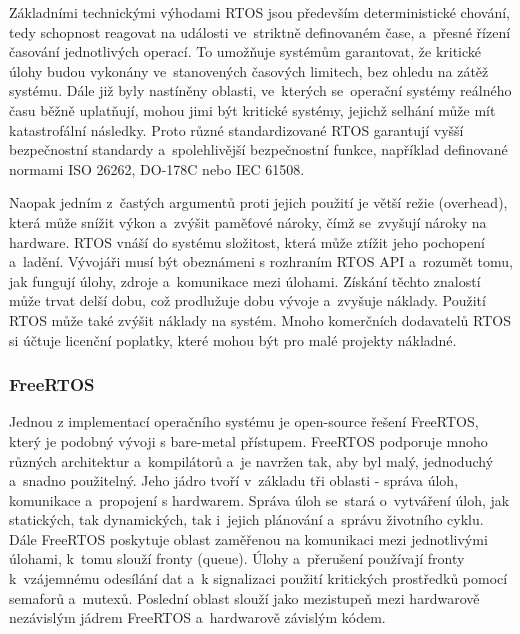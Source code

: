 Základními technickými výhodami RTOS jsou především deterministické chování, tedy schopnost reagovat na události ve~striktně definovaném čase, a~přesné řízení časování jednotlivých operací. To umožňuje systémům garantovat, že kritické úlohy budou vykonány ve~stanovených časových limitech, bez ohledu na zátěž systému. Dále již byly nastíněny oblasti, ve~kterých se~operační systémy reálného času běžně uplatňují, mohou jimi být kritické systémy, jejichž selhání může mít katastrofální následky. Proto různé standardizované RTOS garantují vyšší bezpečnostní standardy a~spolehlivější bezpečnostní funkce, například definované normami ISO 26262, DO-178C nebo IEC 61508.~\cite{freertos_safertos}

Naopak jedním z~častých argumentů proti jejich použití je větší režie (overhead), která může snížit výkon a~zvýšit paměťové nároky, čímž se~zvyšují nároky na hardware. RTOS vnáší do systému složitost, která může ztížit jeho pochopení a~ladění. Vývojáři musí být obeznámeni s rozhraním RTOS API a~rozumět tomu, jak fungují úlohy, zdroje a~komunikace mezi úlohami. Získání těchto znalostí může trvat delší dobu, což prodlužuje dobu vývoje a~zvyšuje náklady. Použití RTOS může také zvýšit náklady na systém. Mnoho komerčních dodavatelů RTOS si účtuje licenční poplatky, které mohou být pro malé projekty nákladné.~\cite{sysgo_baremetal_vs_rtos}

\subsubsection{FreeRTOS}
Jednou z implementací operačního systému je open-source řešení FreeRTOS, který je podobný vývoji s bare-metal přístupem. FreeRTOS podporuje mnoho různých architektur a~kompilátorů a~je navržen tak, aby byl malý, jednoduchý a~snadno použitelný. Jeho jádro tvoří v~základu tři oblasti - správa úloh, komunikace a~propojení s hardwarem. Správa úloh se~stará o~vytváření úloh, jak statických, tak dynamických, tak i~jejich plánování a~správu životního cyklu. Dále FreeRTOS poskytuje oblast zaměřenou na komunikaci mezi jednotlivými úlohami, k~tomu slouží fronty (queue). Úlohy a~přerušení používají fronty k~vzájemnému odesílání dat a~k signalizaci použití kritických prostředků pomocí semaforů a~mutexů. Poslední oblast slouží jako mezistupeň mezi hardwarově nezávislým jádrem FreeRTOS a~hardwarově závislým kódem.~\cite{the_architecture_of_open_source_applications}


